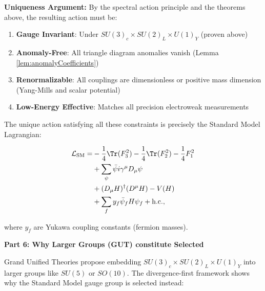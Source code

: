 \textbf{Uniqueness Argument:} By the spectral action principle and the theorems above, the resulting action must be:

\begin{enumerate}
\item \textbf{Gauge Invariant}: Under $SU(3)_c \times SU(2)_L \times U(1)_Y$ (proven above)
\item \textbf{Anomaly-Free}: All triangle diagram anomalies vanish (Lemma \ref{lem:anomalyCoefficients})
\item \textbf{Renormalizable}: All couplings are dimensionless or positive mass dimension (Yang-Mills and scalar potential)
\item \textbf{Low-Energy Effective}: Matches all precision electroweak measurements
\end{enumerate}

The unique action satisfying all these constraints is precisely the Standard Model Lagrangian:

\begin{equation}
\label{eq:standardModelLagrangian}
\begin{split}
\mathcal{L}_{\text{SM}} = &-\frac{1}{4}\Tr(F_3^2) - \frac{1}{4}\Tr(F_2^2) - \frac{1}{4}F_1^2 \\
&+ \sum_{\psi} \bar{\psi} i\gamma^\mu D_\mu \psi \\
&+ (D_\mu H)^\dagger (D^\mu H) - V(H) \\
&+ \sum_f y_f \bar{\psi}_f H \psi_f + \text{h.c.},
\end{split}
\end{equation}

where $y_f$ are Yukawa coupling constants (fermion masses).

\textbf{Part 6: Why Larger Groups (GUT) constitute Selected}

Grand Unified Theories propose embedding $SU(3)_c \times SU(2)_L \times U(1)_Y$ into larger groups like $SU(5)$ or $SO(10)$. The divergence-first framework shows why the Standard Model gauge group is selected instead:

